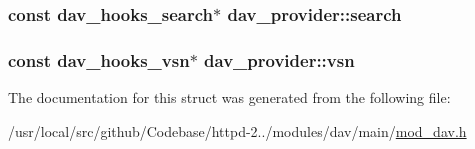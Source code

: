 \subsubsection[{\texorpdfstring{search}{search}}]{\setlength{\rightskip}{0pt plus 5cm}const {\bf dav\+\_\+hooks\+\_\+search}$\ast$ dav\+\_\+provider\+::search}\hypertarget{structdav__provider_a7ffb89a0dd7d7558cb2f130ecd11dc29}{}\label{structdav__provider_a7ffb89a0dd7d7558cb2f130ecd11dc29}
\subsubsection[{\texorpdfstring{vsn}{vsn}}]{\setlength{\rightskip}{0pt plus 5cm}const {\bf dav\+\_\+hooks\+\_\+vsn}$\ast$ dav\+\_\+provider\+::vsn}\hypertarget{structdav__provider_a16ffd4af16dbf41759d0d0a69e382da6}{}\label{structdav__provider_a16ffd4af16dbf41759d0d0a69e382da6}


The documentation for this struct was generated from the following file\+:\begin{DoxyCompactItemize}
\item 
/usr/local/src/github/\+Codebase/httpd-\/2../modules/dav/main/\hyperlink{mod__dav_8h}{mod\+\_\+dav.\+h}\end{DoxyCompactItemize}
